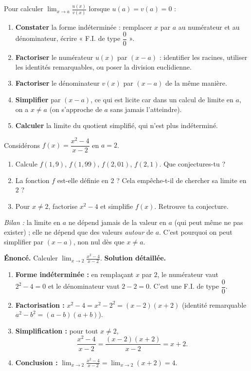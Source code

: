 \documentclass[11pt]{article}
\begin{document}
\begin{methode}
Pour calculer $\displaystyle\lim_{x \to a} \frac{u(x)}{v(x)}$ lorsque $u(a) = v(a) = 0$ :
\begin{enumerate}
\item \textbf{Constater} la forme indéterminée : remplacer $x$ par $a$ au numérateur et au dénominateur, écrire « F.I. de type $\dfrac{0}{0}$ ».
\item \textbf{Factoriser} le numérateur $u(x)$ par $(x-a)$ : identifier les racines, utiliser les identités remarquables, ou poser la division euclidienne.
\item \textbf{Factoriser} le dénominateur $v(x)$ par $(x-a)$ de la même manière.
\item \textbf{Simplifier} par $(x-a)$, ce qui est licite car dans un calcul de limite en $a$, on a $x \neq a$ (on s'approche de $a$ sans jamais l'atteindre).
\item \textbf{Calculer} la limite du quotient simplifié, qui n'est plus indéterminé.
\end{enumerate}
\end{methode}

\begin{experience}
Considérons $f(x) = \dfrac{x^2 - 4}{x - 2}$ en $a = 2$.
\begin{enumerate}
\item Calcule $f(1{,}9)$, $f(1{,}99)$, $f(2{,}01)$, $f(2{,}1)$. Que conjectures-tu ?
\item La fonction $f$ est-elle définie en $2$ ? Cela empêche-t-il de chercher sa limite en $2$ ?
\item Pour $x \neq 2$, factorise $x^2 - 4$ et simplifie $f(x)$. Retrouve ta conjecture.
\end{enumerate}
\emph{Bilan :} la limite en $a$ ne dépend jamais de la valeur en $a$ (qui peut même ne pas exister) ; elle ne dépend que des valeurs \emph{autour} de $a$. C'est pourquoi on peut simplifier par $(x-a)$, non nul dès que $x \neq a$.
\end{experience}

\begin{exoresolu}
\textbf{Énoncé.} Calculer $\displaystyle\lim_{x \to 2} \frac{x^2 - 4}{x - 2}$.
\tcblower
\textbf{Solution détaillée.}
\begin{enumerate}
\item \textbf{Forme indéterminée :} en remplaçant $x$ par $2$, le numérateur vaut $2^2 - 4 = 0$ et le dénominateur vaut $2 - 2 = 0$. C'est une F.I. de type $\dfrac{0}{0}$.
\item \textbf{Factorisation :} $x^2 - 4 = x^2 - 2^2 = (x-2)(x+2)$ (identité remarquable $a^2 - b^2 = (a-b)(a+b)$).
\item \textbf{Simplification :} pour tout $x \neq 2$,
\[ \frac{x^2 - 4}{x - 2} = \frac{(x-2)(x+2)}{x-2} = x + 2. \]
\item \textbf{Conclusion :} $\displaystyle\lim_{x \to 2} \frac{x^2 - 4}{x - 2} = \lim_{x \to 2} (x+2) = 4$.
\end{enumerate}
\end{exoresolu}
\end{document}
